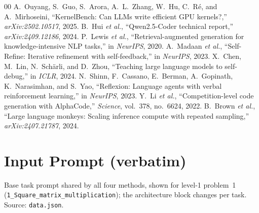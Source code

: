 \documentclass[conference]{IEEEtran}
\newcommand{\mainbodyendpage}{?}
\begin{document}
\begin{thebibliography}{00}
 A.~Ouyang, S.~Guo, S.~Arora, A.~L.~Zhang, W.~Hu, C.~R\'e, and
A.~Mirhoseini, ``KernelBench: Can LLMs write efficient GPU kernels?,''
\emph{arXiv:2502.10517}, 2025.
 B.~Hui \emph{et al.}, ``Qwen2.5-Coder technical report,''
\emph{arXiv:2409.12186}, 2024.
 P.~Lewis \emph{et al.}, ``Retrieval-augmented generation for
knowledge-intensive NLP tasks,'' in \emph{NeurIPS}, 2020.
 A.~Madaan \emph{et al.}, ``Self-Refine: Iterative refinement
with self-feedback,'' in \emph{NeurIPS}, 2023.
 X.~Chen, M.~Lin, N.~Sch\"arli, and D.~Zhou, ``Teaching large
language models to self-debug,'' in \emph{ICLR}, 2024.
 N.~Shinn, F.~Cassano, E.~Berman, A.~Gopinath, K.~Narasimhan,
and S.~Yao, ``Reflexion: Language agents with verbal reinforcement learning,'' in
\emph{NeurIPS}, 2023.
 Y.~Li \emph{et al.}, ``Competition-level code generation with
AlphaCode,'' \emph{Science}, vol.~378, no.~6624, 2022.
 B.~Brown \emph{et al.}, ``Large language monkeys: Scaling
inference compute with repeated sampling,'' \emph{arXiv:2407.21787}, 2024.
\end{thebibliography}

\xdef\mainbodyendpage{\thepage}

\appendices

\section{Input Prompt (verbatim)}

Base task prompt shared by all four methods, shown for level-1 problem~1
(\texttt{1\_Square\_matrix\_multiplication}); the architecture block changes per
task. Source: \texttt{data.json}.
\end{document}
